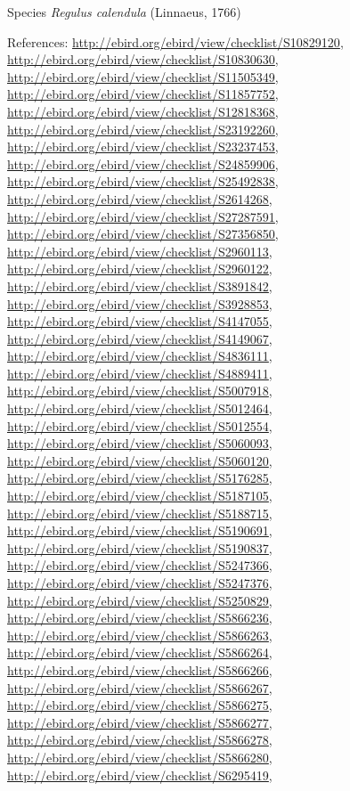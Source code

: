 \documentclass[9pt, article]{memoir}
\begin{document}
\begin{multicols}{2}
\vspace{6pt}\noindent\hspace{36pt}Species \textit{Regulus calendula} (Linnaeus, 1766)


\vspace{6pt}References: 
\url{http://ebird.org/ebird/view/checklist/S10829120}, 
\url{http://ebird.org/ebird/view/checklist/S10830630}, 
\url{http://ebird.org/ebird/view/checklist/S11505349}, 
\url{http://ebird.org/ebird/view/checklist/S11857752}, 
\url{http://ebird.org/ebird/view/checklist/S12818368}, 
\url{http://ebird.org/ebird/view/checklist/S23192260}, 
\url{http://ebird.org/ebird/view/checklist/S23237453}, 
\url{http://ebird.org/ebird/view/checklist/S24859906}, 
\url{http://ebird.org/ebird/view/checklist/S25492838}, 
\url{http://ebird.org/ebird/view/checklist/S2614268}, 
\url{http://ebird.org/ebird/view/checklist/S27287591}, 
\url{http://ebird.org/ebird/view/checklist/S27356850}, 
\url{http://ebird.org/ebird/view/checklist/S2960113}, 
\url{http://ebird.org/ebird/view/checklist/S2960122}, 
\url{http://ebird.org/ebird/view/checklist/S3891842}, 
\url{http://ebird.org/ebird/view/checklist/S3928853}, 
\url{http://ebird.org/ebird/view/checklist/S4147055}, 
\url{http://ebird.org/ebird/view/checklist/S4149067}, 
\url{http://ebird.org/ebird/view/checklist/S4836111}, 
\url{http://ebird.org/ebird/view/checklist/S4889411}, 
\url{http://ebird.org/ebird/view/checklist/S5007918}, 
\url{http://ebird.org/ebird/view/checklist/S5012464}, 
\url{http://ebird.org/ebird/view/checklist/S5012554}, 
\url{http://ebird.org/ebird/view/checklist/S5060093}, 
\url{http://ebird.org/ebird/view/checklist/S5060120}, 
\url{http://ebird.org/ebird/view/checklist/S5176285}, 
\url{http://ebird.org/ebird/view/checklist/S5187105}, 
\url{http://ebird.org/ebird/view/checklist/S5188715}, 
\url{http://ebird.org/ebird/view/checklist/S5190691}, 
\url{http://ebird.org/ebird/view/checklist/S5190837}, 
\url{http://ebird.org/ebird/view/checklist/S5247366}, 
\url{http://ebird.org/ebird/view/checklist/S5247376}, 
\url{http://ebird.org/ebird/view/checklist/S5250829}, 
\url{http://ebird.org/ebird/view/checklist/S5866236}, 
\url{http://ebird.org/ebird/view/checklist/S5866263}, 
\url{http://ebird.org/ebird/view/checklist/S5866264}, 
\url{http://ebird.org/ebird/view/checklist/S5866266}, 
\url{http://ebird.org/ebird/view/checklist/S5866267}, 
\url{http://ebird.org/ebird/view/checklist/S5866275}, 
\url{http://ebird.org/ebird/view/checklist/S5866277}, 
\url{http://ebird.org/ebird/view/checklist/S5866278}, 
\url{http://ebird.org/ebird/view/checklist/S5866280}, 
\url{http://ebird.org/ebird/view/checklist/S6295419}, 

\end{multicols}
\end{document}
